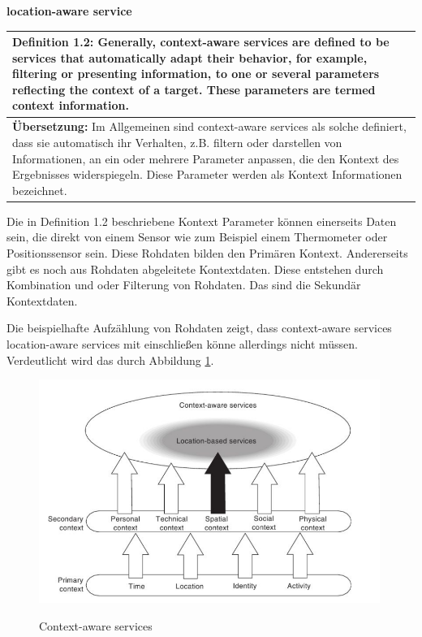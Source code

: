 \textbf{location-aware service} \\
\begin{table}[h]
	\centering
	\begin{tabular}{|p{16cm}|}\hline
		\textbf{Definition 1.2:} \glqq Generally, context-aware services are defined to be services that automatically adapt their behavior, for example, filtering or presenting information, to one or several parameters reflecting the context of a target. These parameters are termed context information.\grqq \cite[S.2]{Kuepper2005}\\ \hline
		\textbf{Übersetzung:} Im Allgemeinen sind context-aware services als solche definiert, dass sie automatisch ihr Verhalten, z.B. filtern oder darstellen von Informationen, an ein oder mehrere Parameter anpassen, die den Kontext des Ergebnisses widerspiegeln. Diese Parameter werden als Kontext Informationen bezeichnet. \\ \hline
	\end{tabular}
\end{table}

Die in Definition 1.2 beschriebene Kontext Parameter können einerseits Daten sein, die direkt von einem Sensor wie zum Beispiel einem Thermometer oder Positionssensor sein. Diese Rohdaten bilden den Primären Kontext. Andererseits gibt es noch aus Rohdaten abgeleitete Kontextdaten. Diese entstehen durch Kombination und oder Filterung von Rohdaten. Das sind die Sekundär Kontextdaten. 
\cite[S.2]{Kuepper2005}

Die beispielhafte Aufzählung von Rohdaten zeigt, dass context-aware services location-aware services mit einschließen könne allerdings nicht müssen. Verdeutlicht wird das durch Abbildung \ref{fig:context-aware services}.


\begin{figure}[h]
\centering
\includegraphics[width=0.99\textwidth]{ref/images/definitionK.png}
\caption[Context-aware services]{Context-aware services}
\label{fig:context-aware services}
\cite[S. 2]{Kuepper2005}
\end{figure}

